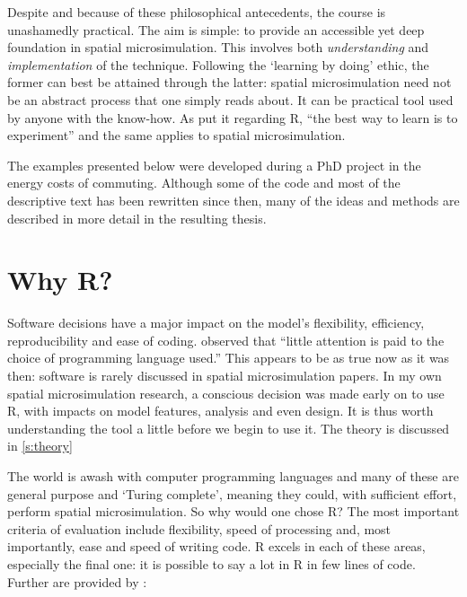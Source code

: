 \documentclass[a5paper, 11pt, twoside]{book}  %
\begin{document}
Despite and because of these philosophical antecedents, the course is
unashamedly practical. The aim is simple: to provide an accessible yet
deep foundation in spatial microsimulation. This involves both
\emph{understanding} and \emph{implementation} of the technique.
Following the `learning by doing' ethic, the former can best be
attained through the latter: spatial microsimulation need not be an abstract
process that one simply reads about. It can be practical tool used by anyone
with the know-how. As \citet[xxii]{kabacoff2011r} put it regarding R, ``the best
way to learn is to experiment'' and the same applies to spatial microsimulation.

The examples presented below were developed during a PhD project in the energy
costs of commuting. Although some of the code and most of the descriptive text
has been rewritten since then, many of the ideas and methods are described in
more detail in the resulting thesis.%

\section{Why R?} \label{setsim} %

Software decisions have a major impact on the model's flexibility, efficiency,
reproducibility and
ease of coding. \citet[p.~153]{Holm1987} observed that ``little attention is
paid to the choice of programming language used.''
This appears to be as true now as it was then: software is rarely discussed in
spatial microsimulation papers. 
In my own spatial microsimulation research, a conscious decision was made early
on to use R, with impacts on model features, analysis
and even design. It is thus worth understanding the tool a little before we
begin to use it. The theory is discussed in \cref{s:theory}

The world is awash with computer programming languages and many of these
are general purpose and `Turing complete', meaning they could, with sufficient
effort, perform spatial microsimulation. So why would one chose R?
The most important criteria of evaluation include flexibility,
speed of processing and, most importantly, ease and speed of writing code.
R excels in each of these areas, especially the final one: it
is possible to say a lot in R in few lines of code. Further
are provided by \citet{Matloff-R}:
\end{document}
